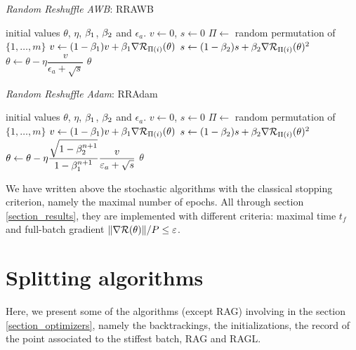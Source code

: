 \begin{algorithm}[h!]
	\caption{{\it Random Reshuffle AWB}: RRAWB}
	\begin{algorithmic}
		\REQUIRE initial values $\theta$, $\eta$, $\beta_1$, $\beta_2$ and $\epsilon_a$.
		\STATE $v\leftarrow 0$, $s\leftarrow 0$
		\STATE $\Pi \leftarrow$ random permutation of $\{1,\dots,m\}$
		\STATE $v \leftarrow(1-\beta_1)v + \beta_1 \nabla \mathcal{R}_{\Pi(i)}(\theta)$
		\STATE $s \leftarrow (1-\beta_2)s + \beta_2 \nabla \mathcal{R}_{\Pi(i)}(\theta)^2$
		\STATE $\theta \leftarrow \theta -\eta \dfrac{v}{\epsilon_a+\sqrt{s}}$
		\ENDFOR
		\ENDFOR
		\RETURN $\theta$
	\end{algorithmic}
	\label{algo_RRAWB}
\end{algorithm} 

\begin{algorithm}[h!]
	\caption{{\it Random Reshuffle Adam}: RRAdam}
	\begin{algorithmic}
		\REQUIRE initial values $\theta$, $\eta$, $\beta_1$, $\beta_2$ and $\epsilon_a$.
		\STATE $v\leftarrow 0$, $s\leftarrow 0$
		\FOR{$n=0, \dots, n_{max}-1$}
		\STATE $\Pi \leftarrow$ random permutation of $\{1,\dots,m\}$
		\FOR{$i=1, \dots, m$}
		\STATE $v \leftarrow(1-\beta_1)v + \beta_1 \nabla \mathcal{R}_{\Pi(i)}(\theta)$
		\STATE $s \leftarrow (1-\beta_2)s + \beta_2 \nabla \mathcal{R}_{\Pi(i)}(\theta)^2$
		\STATE $\theta \leftarrow \theta -\eta \dfrac{\sqrt{1-\beta_2^{n+1}}}{1-\beta_1^{n+1}} \dfrac{v}{\varepsilon_a+\sqrt{s}}$
		\ENDFOR
		\ENDFOR
		\RETURN $\theta$
	\end{algorithmic}
	\label{algo_RRAdam}
\end{algorithm} 

\begin{remark}
	We have written above the stochastic algorithms with the classical stopping criterion, namely the maximal number of epochs. All through section \ref{section_results}, they are implemented with different criteria: maximal time $t_f$ and full-batch gradient $\|\nabla \mathcal{R}(\theta)\|/P \leq \varepsilon$.
\end{remark}



\section{Splitting algorithms}
\label{annexe_algo}

Here, we present some of the algorithms (except RAG) involving in the section \ref{section_optimizers}, namely the backtrackings, the initializations, the record of the point associated to the stiffest batch, RAG and RAGL. 

